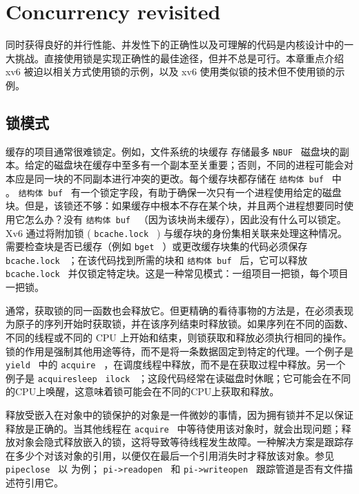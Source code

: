 
   \chapter{Concurrency revisited}   
    \label{CH:LOCK2}     

同时获得良好的并行性能、并发性下的正确性以及可理解的代码是内核设计中的一大挑战。直接使用锁是实现正确性的最佳途径，但并不总是可行。本章重点介绍 xv6 被迫以相关方式使用锁的示例，以及 xv6 使用类似锁的技术但不使用锁的示例。  

   \section{锁模式  }     

缓存的项目通常很难锁定。例如，文件系统的块缓存        存储最多  {    \tt    NBUF   }  磁盘块的副本。给定的磁盘块在缓存中至多有一个副本至关重要；否则，不同的进程可能会对本应是同一块的不同副本进行冲突的更改。每个缓存块都存储在  {    \tt    结构体 buf   }  中
        。  {    \tt    结构体 buf   }  有一个锁定字段，有助于确保一次只有一个进程使用给定的磁盘块。但是，该锁还不够：如果缓存中根本不存在某个块，并且两个进程想要同时使用它怎么办？没有  {    \tt    结构体 buf   } （因为该块尚未缓存），因此没有什么可以锁定。 Xv6 通过将附加锁 (  {    \tt    bcache.lock   }  ) 与缓存块的身份集相关联来处理这种情况。需要检查块是否已缓存（例如  {    \tt    bget   }         ）或更改缓存块集的代码必须保存  {    \tt    bcache.lock   }  ；在该代码找到所需的块和  {    \tt    结构体 buf   }  后，它可以释放  {    \tt    bcache.lock   }  并仅锁定特定块。这是一种常见模式：一组项目一把锁，每个项目一把锁。

通常，获取锁的同一函数也会释放它。但更精确的看待事物的方法是，在必须表现为原子的序列开始时获取锁，并在该序列结束时释放锁。如果序列在不同的函数、不同的线程或不同的 CPU 上开始和结束，则锁获取和释放必须执行相同的操作。锁的作用是强制其他用途等待，而不是将一条数据固定到特定的代理。一个例子是  {    \tt    yield   }  中的  {    \tt    acquire   } 
       ，在调度线程中释放，而不是在获取过程中释放。另一个例子是
  {    \tt    acquiresleep   }   {    \tt    ilock   }         ；这段代码经常在读磁盘时休眠；它可能会在不同的CPU上唤醒，这意味着锁可能会在不同的CPU上获取和释放。  

释放受嵌入在对象中的锁保护的对象是一件微妙的事情，因为拥有锁并不足以保证释放是正确的。当其他线程在  {    \tt    acquire   }  中等待使用该对象时，就会出现问题；释放对象会隐式释放嵌入的锁，这将导致等待线程发生故障。一种解决方案是跟踪存在多少个对该对象的引用，以便仅在最后一个引用消失时才释放该对象。参见  {    \tt    pipeclose   } 
 以        为例；
  {    \tt    pi->readopen   }  和  {    \tt    pi->writeopen   }  跟踪管道是否有文件描述符引用它。  

